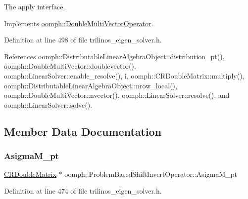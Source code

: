 The apply interface. 



Implements \hyperlink{classoomph_1_1DoubleMultiVectorOperator_a58ada02505907b7b51e336ee1d79031c}{oomph\+::\+Double\+Multi\+Vector\+Operator}.



Definition at line 498 of file trilinos\+\_\+eigen\+\_\+solver.\+h.



References oomph\+::\+Distributable\+Linear\+Algebra\+Object\+::distribution\+\_\+pt(), oomph\+::\+Double\+Multi\+Vector\+::doublevector(), oomph\+::\+Linear\+Solver\+::enable\+\_\+resolve(), i, oomph\+::\+C\+R\+Double\+Matrix\+::multiply(), oomph\+::\+Distributable\+Linear\+Algebra\+Object\+::nrow\+\_\+local(), oomph\+::\+Double\+Multi\+Vector\+::nvector(), oomph\+::\+Linear\+Solver\+::resolve(), and oomph\+::\+Linear\+Solver\+::solve().



\subsection{Member Data Documentation}
\mbox{\label{classoomph_1_1ProblemBasedShiftInvertOperator_a58f8942b2daecd973333d2dc21c3a387}} 
\subsubsection{\texorpdfstring{Asigma\+M\+\_\+pt}{AsigmaM\_pt}}
{\footnotesize\ttfamily \hyperlink{classoomph_1_1CRDoubleMatrix}{C\+R\+Double\+Matrix} $\ast$ oomph\+::\+Problem\+Based\+Shift\+Invert\+Operator\+::\+Asigma\+M\+\_\+pt\hspace{0.3cm}{\ttfamily [private]}}



Definition at line 474 of file trilinos\+\_\+eigen\+\_\+solver.\+h.

\mbox{\label{classoomph_1_1ProblemBasedShiftInvertOperator_ab3e4e60c51ea08ac19adf60ed57e95b7}} 
